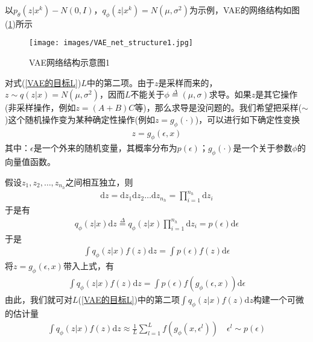             \par
            以$p_\theta(z|x^k) - N(0,I)$，$q_\phi(z|x^k) = N(\mu,\sigma^2)$为示例，VAE的网络结构如图(\ref{fig:VAE网络结构示意图1})所示
            \begin{figure}[H]
            \centering
            \texttt{[image: images/VAE\_net\_structure1.jpg]}
            \caption{VAE网络结构示意图1}
            \label{fig:VAE网络结构示意图1}
            \end{figure}
            \par
            对式(\ref{VAE的目标L})$L$中的第二项。由于$z$是采样而来的，$z\sim q(z|x) = N(\mu,\sigma^2)$，因而$L$不能关于$\phi \overset{\Delta}{=}(\mu,\sigma)$求导。如果$z$是其它操作(非采样操作，例如$z = (A+B)C$等)，那么求导是没问题的。我们希望把采样($\sim$)这个随机操作变为某种确定性操作(例如$z = g_\phi(\cdot)$)，可以进行如下确定性变换
            \begin{align*}
            z = g_\phi(\epsilon,x)
            \end{align*}
            其中：$\epsilon$是一个外来的随机变量，其概率分布为$p(\epsilon)$；$g_\phi(\cdot)$是一个关于参数$\phi$的向量值函数。
            \par
            假设$z_1,z_2,\dots,z_{n_h}$之间相互独立，则
            \begin{align*}
            \mathrm{d}z = \mathrm{d}z_1\mathrm{d}z_2\dots\mathrm{d}z_{n_h} = \prod_{i=1}^{n_h}\mathrm{d}z_i
            \end{align*}
            于是有
            \begin{align*}
            q_\phi(z|x)\mathrm{d}z \overset{\Delta}{=} q_\phi(z|x) \prod_{i=1}^{n_h}\mathrm{d}z_i = p(\epsilon) \mathrm{d} \epsilon
            \end{align*}
            于是
            \begin{align*}
            \int q_\phi(z|x) f(z)\mathrm{d}z = \int p(\epsilon) f(z)\mathrm{d}\epsilon
            \end{align*}
            将$z = g_\phi(\epsilon,x)$带入上式，有
            \begin{align*}
            \int q_\phi(z|x) f(z)\mathrm{d}z = \int p(\epsilon) f(g_\phi(\epsilon,x))\mathrm{d}\epsilon
            \end{align*}
            由此，我们就可对$L$(\ref{VAE的目标L})中的第二项$\int q_\phi(z|x)f(z)\mathrm{d}z$构建一个可微的估计量
            \begin{align*}
            \int q_\phi (z|x)f(z)\mathrm{d}z \approx \frac{1}{L}\sum_{l=1}^L f(g_\phi (x,\epsilon^l)) \quad \epsilon^l \sim p(\epsilon)
            \end{align*}
